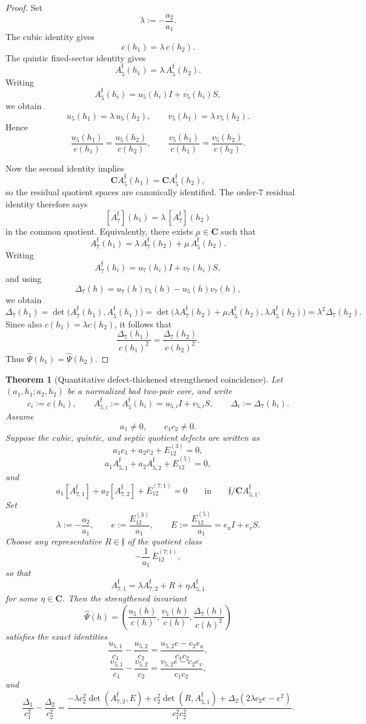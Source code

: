 \documentclass[11pt,a4paper]{amsart}
\theoremstyle{plain}
\newtheorem{theorem}{Theorem}[section]
\theoremstyle{definition}
\begin{document}
\begin{proof}
Set
\[
\lambda:=-\frac{a_2}{a_1}.
\]
The cubic identity gives
\[
c(h_1)=\lambda\,c(h_2).
\]
The quintic fixed-sector identity gives
\[
A_5^{\mathfrak f}(h_1)=\lambda\,A_5^{\mathfrak f}(h_2).
\]
Writing
\[
A_5^{\mathfrak f}(h_i)=u_5(h_i)I+v_5(h_i)S,
\]
we obtain
\[
u_5(h_1)=\lambda\,u_5(h_2),
\qquad
v_5(h_1)=\lambda\,v_5(h_2).
\]
Hence
\[
\frac{u_5(h_1)}{c(h_1)}=\frac{u_5(h_2)}{c(h_2)},
\qquad
\frac{v_5(h_1)}{c(h_1)}=\frac{v_5(h_2)}{c(h_2)}.
\]

Now the second identity implies
\[
\mathbf C A_5^{\mathfrak f}(h_1)=\mathbf C A_5^{\mathfrak f}(h_2),
\]
so the residual quotient spaces are canonically identified. The order-$7$
residual identity therefore says
\[
[A_7^{\mathfrak f}](h_1)=\lambda\,[A_7^{\mathfrak f}](h_2)
\]
in the common quotient. Equivalently, there exists $\mu\in\mathbf C$ such
that
\[
A_7^{\mathfrak f}(h_1)=\lambda\,A_7^{\mathfrak f}(h_2)+\mu\,A_5^{\mathfrak f}(h_2).
\]
Writing
\[
A_7^{\mathfrak f}(h_i)=u_7(h_i)I+v_7(h_i)S,
\]
and using
\[
\Delta_7(h)=u_7(h)v_5(h)-u_5(h)v_7(h),
\]
we obtain
\[
\Delta_7(h_1)
=
\det\!\bigl(A_7^{\mathfrak f}(h_1),A_5^{\mathfrak f}(h_1)\bigr)
=
\det\!\bigl(\lambda A_7^{\mathfrak f}(h_2)+\mu A_5^{\mathfrak f}(h_2),
\lambda A_5^{\mathfrak f}(h_2)\bigr)
=
\lambda^2\Delta_7(h_2).
\]
Since also $c(h_1)=\lambda c(h_2)$, it follows that
\[
\frac{\Delta_7(h_1)}{c(h_1)^2}
=
\frac{\Delta_7(h_2)}{c(h_2)^2}.
\]
Thus $\widehat\Psi(h_1)=\widehat\Psi(h_2)$.
\end{proof}

\begin{theorem}[Quantitative defect-thickened strengthened coincidence]
\label{thm:quantitative-defect-thickened-strengthened-coincidence}
Let $(a_1,h_1;a_2,h_2)$ be a normalized bad two-pair core, and write
\[
c_i:=c(h_i),
\qquad
A_{5,i}^{\mathfrak f}:=A_5^{\mathfrak f}(h_i)=u_{5,i}I+v_{5,i}S,
\qquad
\Delta_i:=\Delta_7(h_i).
\]
Assume
\[
a_1\neq 0,
\qquad
c_1c_2\neq 0.
\]
Suppose the cubic, quintic, and septic quotient defects are written as
\[
a_1c_1+a_2c_2+E_{12}^{(3)}=0,
\]
\[
a_1A_{5,1}^{\mathfrak f}+a_2A_{5,2}^{\mathfrak f}+E_{12}^{(5)}=0,
\]
and
\[
a_1[A_{7,1}^{\mathfrak f}]+a_2[A_{7,2}^{\mathfrak f}]
+\overline E_{12}^{(7;1)}=0
\qquad\text{in}\qquad
\mathfrak f/\mathbf C A_{5,1}^{\mathfrak f}.
\]
Set
\[
\lambda:=-\frac{a_2}{a_1},
\qquad
e:=\frac{E_{12}^{(3)}}{a_1},
\qquad
E:=\frac{E_{12}^{(5)}}{a_1}=e_u I+e_v S.
\]
Choose any representative $R\in\mathfrak f$ of the quotient class
\[
-\frac{1}{a_1}\,\overline E_{12}^{(7;1)},
\]
so that
\[
A_{7,1}^{\mathfrak f}
=
\lambda A_{7,2}^{\mathfrak f}
+
R
+
\eta A_{5,1}^{\mathfrak f}
\]
for some $\eta\in\mathbf C$. Then the strengthened invariant
\[
\widehat\Psi(h)=
\left(
\frac{u_5(h)}{c(h)},
\frac{v_5(h)}{c(h)},
\frac{\Delta_7(h)}{c(h)^2}
\right)
\]
satisfies the exact identities
\[
\frac{u_{5,1}}{c_1}-\frac{u_{5,2}}{c_2}
=
\frac{u_{5,2}e-c_2e_u}{c_1c_2},
\]
\[
\frac{v_{5,1}}{c_1}-\frac{v_{5,2}}{c_2}
=
\frac{v_{5,2}e-c_2e_v}{c_1c_2},
\]
and
\[
\frac{\Delta_1}{c_1^2}-\frac{\Delta_2}{c_2^2}
=
\frac{
-\lambda c_2^2\det(A_{7,2}^{\mathfrak f},E)
+
c_2^2\det(R,A_{5,1}^{\mathfrak f})
+
\Delta_2(2\lambda c_2 e-e^2)
}{c_1^2c_2^2}.
\]
\end{theorem}
\end{document}
